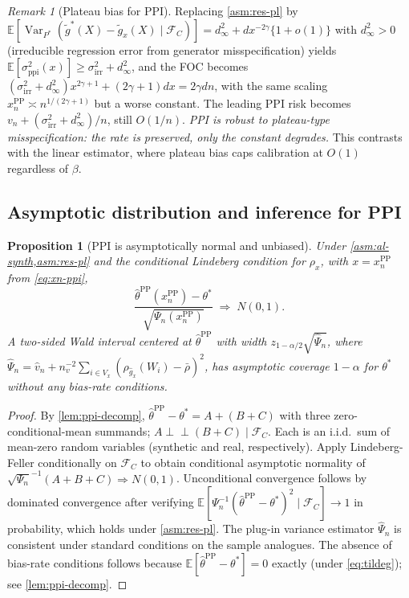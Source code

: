 \documentclass[11pt]{article}
\theoremstyle{plain}
\newtheorem{proposition}[theorem]{Proposition}
\theoremstyle{definition}
\theoremstyle{remark}
\newtheorem{remark}[theorem]{Remark}
\newcommand{\E}{\mathbb{E}}
\newcommand{\Var}{\operatorname{Var}}
\newcommand{\indep}{\perp\!\!\!\perp}
\begin{document}
\begin{remark}[Plateau bias for PPI]\label{rem:ppi-plateau}
Replacing \cref{asm:res-pl} by $\E[\Var_{P^*}(\tilde g^*(X)-\tilde g_x(X)\mid\mathcal{F}_C)]=d_\infty^2+dx^{-2\gamma}\{1+o(1)\}$ with $d_\infty^2>0$ (irreducible regression error from generator misspecification) yields $\E[\sigma_{\mathrm{ppi}}^2(x)]\ge\sigma_{\mathrm{irr}}^2+d_\infty^2$, and the FOC becomes $(\sigma_{\mathrm{irr}}^2+d_\infty^2)x^{2\gamma+1}+(2\gamma+1)dx=2\gamma dn$, with the same scaling $x_n^{\mathrm{PP}}\asymp n^{1/(2\gamma+1)}$ but a worse constant. The leading PPI risk becomes $v_n+(\sigma_{\mathrm{irr}}^2+d_\infty^2)/n$, still $O(1/n)$. \emph{PPI is robust to plateau-type misspecification: the rate is preserved, only the constant degrades.} This contrasts with the linear estimator, where plateau bias caps calibration at $O(1)$ regardless of $\beta$.
\end{remark}

\subsection{Asymptotic distribution and inference for PPI}
\label{ssec:ppi-inference}

\begin{proposition}[PPI is asymptotically normal and unbiased]\label{prop:ppi-clt}
Under \cref{asm:al-synth,asm:res-pl} and the conditional Lindeberg condition for $\rho_x$, with $x=x_n^{\mathrm{PP}}$ from \cref{eq:xn-ppi},
\begin{equation}\label{eq:ppi-clt}
\frac{\hat\theta^{\mathrm{PP}}(x_n^{\mathrm{PP}})-\theta^*}{\sqrt{\Psi_n(x_n^{\mathrm{PP}})}}\;\Rightarrow\;N(0,1).
\end{equation}
A two-sided Wald interval centered at $\hat\theta^{\mathrm{PP}}$ with width $z_{1-\alpha/2}\sqrt{\widehat\Psi_n}$, where $\widehat\Psi_n=\hat v_n+n_v^{-2}\sum_{i\in V_x}(\rho_{\hat g_x}(W_i)-\bar\rho)^2$, has asymptotic coverage $1-\alpha$ for $\theta^*$ without any bias-rate conditions.
\end{proposition}

\begin{proof}
By \cref{lem:ppi-decomp}, $\hat\theta^{\mathrm{PP}}-\theta^*=A+(B+C)$ with three zero-conditional-mean summands; $A\indep(B+C)\mid\mathcal{F}_C$. Each is an i.i.d.\ sum of mean-zero random variables (synthetic and real, respectively). Apply Lindeberg-Feller conditionally on $\mathcal{F}_C$ to obtain conditional asymptotic normality of $\sqrt{\Psi_n}^{-1}(A+B+C)\Rightarrow N(0,1)$. Unconditional convergence follows by dominated convergence after verifying $\E[\Psi_n^{-1}(\hat\theta^{\mathrm{PP}}-\theta^*)^2\mid\mathcal{F}_C]\to1$ in probability, which holds under \cref{asm:res-pl}. The plug-in variance estimator $\widehat\Psi_n$ is consistent under standard conditions on the sample analogues. The absence of bias-rate conditions follows because $\E[\hat\theta^{\mathrm{PP}}-\theta^*]=0$ exactly (under \cref{eq:tildeg}); see \cref{lem:ppi-decomp}.
\end{proof}
\end{document}
